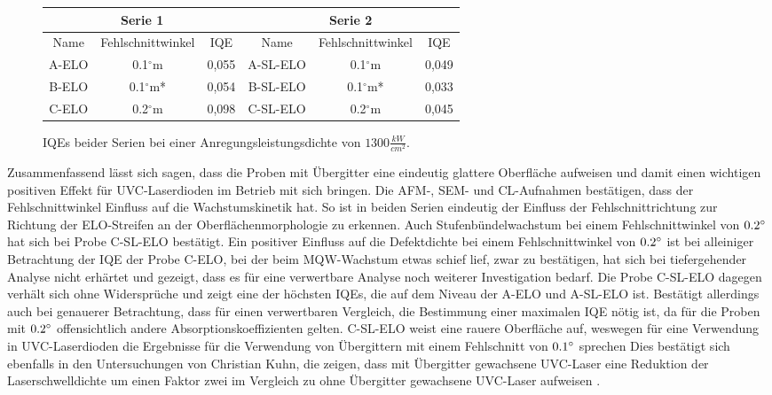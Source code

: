 \begin{figure}[H]
\centering
\begin{tabular}{ |c|c|c|c|c|c|   }
\hline
\multicolumn{3}{|c|}{Serie 1} & \multicolumn{3}{c|}{Serie 2}  \\
\hline
Name & Fehlschnittwinkel & IQE & Name & Fehlschnittwinkel & IQE \\
\hline
A-ELO & 0.1$^\circ$m & 0,055 & A-SL-ELO & 0.1$^\circ$m & 0,049  \\
B-ELO & 0.1$^\circ$m*& 0,054& B-SL-ELO & 0.1$^\circ$m* & 0,033 \\
C-ELO & 0.2$^\circ$m & 0,098& C-SL-ELO & 0.2$^\circ$m & 0,045 \\
\hline
\end{tabular}
\caption{IQEs beider Serien bei einer Anregungsleistungsdichte von $ 1300 \frac{kW}{cm^2} $.}
\end{figure}
\noindent 
Zusammenfassend lässt sich sagen, dass die Proben mit Übergitter eine eindeutig glattere Oberfläche aufweisen und damit einen wichtigen positiven Effekt für UVC-Laserdioden im Betrieb mit sich bringen. Die AFM-, SEM- und CL-Aufnahmen bestätigen, dass der Fehlschnittwinkel Einfluss auf die Wachstumskinetik hat. 
\noindent 
So ist in beiden Serien eindeutig der Einfluss der Fehlschnittrichtung zur Richtung der ELO-Streifen an der Oberflächenmorphologie zu erkennen. Auch Stufenbündelwachstum bei einem Fehlschnittwinkel von $0.2\degree$ hat sich bei Probe C-SL-ELO bestätigt. Ein positiver Einfluss auf die Defektdichte bei einem Fehlschnittwinkel von $0.2 \degree$ ist bei alleiniger Betrachtung der IQE der Probe C-ELO, bei der beim MQW-Wachstum etwas schief lief, zwar zu bestätigen, hat sich bei tiefergehender Analyse nicht erhärtet und gezeigt, dass es für eine verwertbare Analyse noch weiterer Investigation bedarf. 
\noindent 
Die Probe C-SL-ELO dagegen verhält sich ohne Widersprüche und zeigt eine der höchsten IQEs, die auf dem Niveau der A-ELO und A-SL-ELO ist. Bestätigt allerdings auch bei genauerer Betrachtung, dass für einen verwertbaren Vergleich, die Bestimmung einer maximalen IQE nötig ist, da für die Proben mit $0.2\degree$ offensichtlich andere Absorptionskoeffizienten gelten. 
\noindent 
C-SL-ELO weist eine rauere Oberfläche auf, weswegen für eine Verwendung in UVC-Laserdioden die Ergebnisse für die Verwendung von Übergittern mit einem Fehlschnitt von $0.1\degree$ sprechen
Dies bestätigt sich ebenfalls in den Untersuchungen von Christian Kuhn, die zeigen, dass mit Übergitter gewachsene UVC-Laser eine Reduktion der Laserschwelldichte um einen Faktor zwei im Vergleich zu ohne Übergitter gewachsene UVC-Laser aufweisen \cite{doi:10.1002/pssa.201870032}.